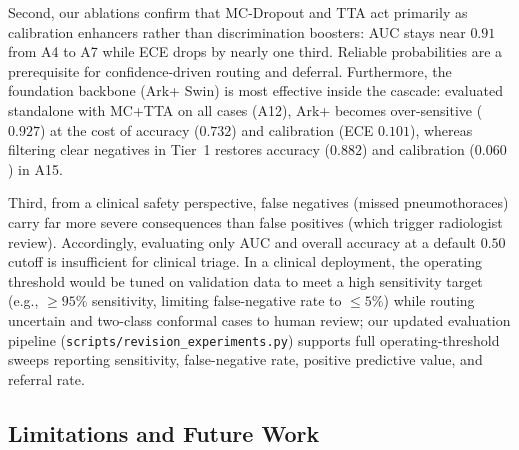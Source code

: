 \documentclass[diagnostics,article,submit,moreauthors]{Definitions/mdpi}
\newcommand{\rev}[1]{#1}
\begin{document}
Second, our ablations confirm that MC-Dropout and TTA act primarily as calibration enhancers rather than discrimination boosters: AUC stays near $0.91$ from A4 to A7 while ECE drops by nearly one third. Reliable probabilities are a prerequisite for confidence-driven routing and deferral. Furthermore, the foundation backbone (Ark+ Swin) is most effective inside the cascade: evaluated standalone with MC+TTA on all cases (A12), Ark+ becomes over-sensitive ($0.927$) at the cost of accuracy ($0.732$) and calibration (ECE $0.101$), whereas filtering clear negatives in Tier~1 restores accuracy ($0.882$) and calibration ($0.060$) in A15.

\rev{Third, from a clinical safety perspective, false negatives (missed pneumothoraces) carry far more severe consequences than false positives (which trigger radiologist review). Accordingly, evaluating only AUC and overall accuracy at a default $0.50$ cutoff is insufficient for clinical triage. In a clinical deployment, the operating threshold would be tuned on validation data to meet a high sensitivity target (e.g., $\ge 95\%$ sensitivity, limiting false-negative rate to $\le 5\%$) while routing uncertain and two-class conformal cases to human review; our updated evaluation pipeline (\texttt{scripts/revision\_experiments.py}) supports full operating-threshold sweeps reporting sensitivity, false-negative rate, positive predictive value, and referral rate.}

\subsection{Limitations and Future Work}
\end{document}
